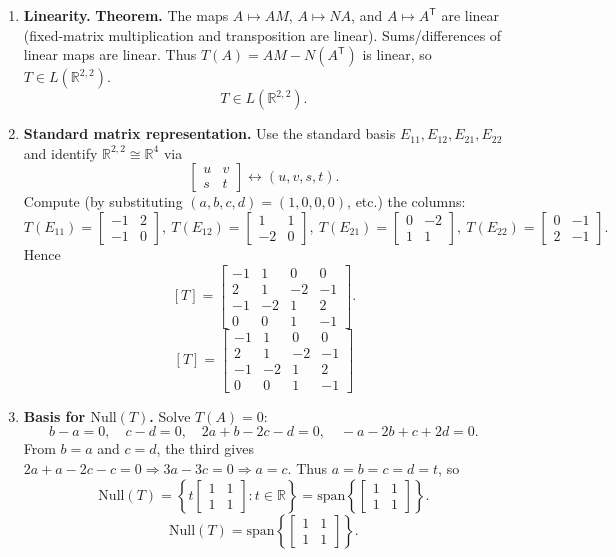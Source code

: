 \documentclass[12pt]{article}
\newcommand{\R}{\mathbb{R}}
\begin{document}
\begin{enumerate}[label=(\alph*)]
\item \textbf{Linearity.}
\textbf{Theorem.} The maps $A\mapsto AM$, $A\mapsto NA$, and $A\mapsto A^{\mathsf T}$ are linear (fixed-matrix multiplication and transposition are linear). Sums/differences of linear maps are linear.
Thus $T(A)=AM-N(A^{\mathsf T})$ is linear, so $T\in L(\R^{2,2})$.
\[
\boxed{\,T\in L(\R^{2,2}).\,}
\]

\newpage
\item \textbf{Standard matrix representation.}
Use the standard basis $E_{11},E_{12},E_{21},E_{22}$ and identify $\R^{2,2}\cong\R^4$ via
\[
\begin{bmatrix}u&v\\s&t\end{bmatrix}\leftrightarrow (u,v,s,t).
\]
Compute (by substituting $(a,b,c,d)=(1,0,0,0)$, etc.) the columns:
\[
T(E_{11})=\begin{bmatrix}-1&2\\-1&0\end{bmatrix},\ 
T(E_{12})=\begin{bmatrix}1&1\\-2&0\end{bmatrix},\ 
T(E_{21})=\begin{bmatrix}0&-2\\1&1\end{bmatrix},\ 
T(E_{22})=\begin{bmatrix}0&-1\\2&-1\end{bmatrix}.
\]
Hence
\[
[T]=
\begin{bmatrix}
-1&1&0&0\\
2&1&-2&-1\\
-1&-2&1&2\\
0&0&1&-1
\end{bmatrix}.
\]
\[
\boxed{\, [T]=
\begin{bmatrix}
-1&1&0&0\\
2&1&-2&-1\\
-1&-2&1&2\\
0&0&1&-1
\end{bmatrix}\,}
\]

\item \textbf{Basis for $\mathrm{Null}(T)$.}
Solve $T(A)=0$:
\[
b-a=0,\quad c-d=0,\quad 2a+b-2c-d=0,\quad -a-2b+c+2d=0.
\]
From $b=a$ and $c=d$, the third gives $2a+a-2c-c=0\Rightarrow 3a-3c=0\Rightarrow a=c$.
Thus $a=b=c=d=t$, so
\[
\mathrm{Null}(T)=\left\{t\begin{bmatrix}1&1\\1&1\end{bmatrix}:t\in\R\right\}
=\mathrm{span}\left\{\begin{bmatrix}1&1\\1&1\end{bmatrix}\right\}.
\]
\[
\boxed{\,\mathrm{Null}(T)=\mathrm{span}\left\{\begin{bmatrix}1&1\\1&1\end{bmatrix}\right\}.\,}
\]


\end{enumerate}
\end{document}
